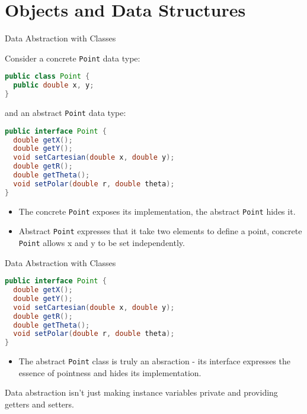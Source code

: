 \documentclass{beamer}
\author[Chris Simpkins]
{Christopher Simpkins \\\texttt{chris.simpkins@gatech.edu}}
\institute[Georgia Tech] %
\date[CS 1331]{}
\begin{document}
\begin{frame}
  \titlepage
\end{frame}

\section{Objects and Data Structures}

\begin{frame}[fragile]{Data Abstraction with Classes}

\vspace{-.05in}
Consider a concrete {\tt Point} data type:
\vspace{-.05in}
\begin{lstlisting}[language=Java]
public class Point {
  public double x, y;
}
\end{lstlisting}
\vspace{-.06in}
and an abstract {\tt Point} data type:
\vspace{-.05in}
\begin{lstlisting}[language=Java]
public interface Point {
  double getX();
  double getY();
  void setCartesian(double x, double y);
  double getR();
  double getTheta();
  void setPolar(double r, double theta);
}
\end{lstlisting}
\vspace{-.1in}
\begin{itemize}
\item The concrete {\tt Point} exposes its implementation, the abstract {\tt Point} hides it.
\item Abstract {\tt Point} expresses that it take two elements to define a point, concrete {\tt Point} allows x and y to be set independently.
\end{itemize}


\end{frame}

\begin{frame}[fragile]{Data Abstraction with Classes}

\vspace{-.05in}
\begin{lstlisting}[language=Java]
public interface Point {
  double getX();
  double getY();
  void setCartesian(double x, double y);
  double getR();
  double getTheta();
  void setPolar(double r, double theta);
}
\end{lstlisting}
\vspace{-.1in}
\begin{itemize}
\item The abstract {\tt Point} class is truly an absraction - its interface expresses the essence of pointness and hides its implementation.
\end{itemize}
Data abstraction isn't just making instance variables private and providing getters and setters.


\end{frame}
\end{document}
